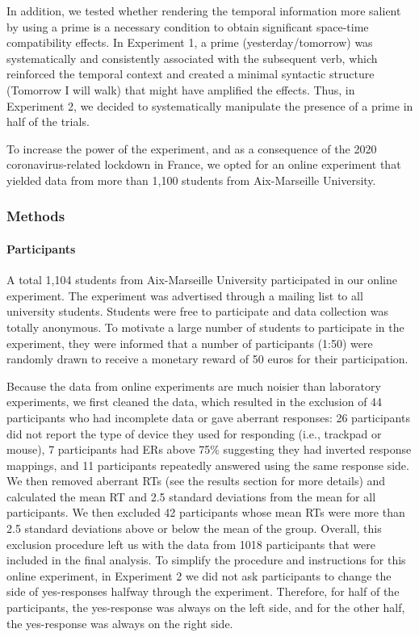 \documentclass[
  a4paper,12pt,twoside,onecolumn,openright,final,oldfontcommands]{memoir}
\begin{document}
In addition, we tested whether rendering the temporal information more salient by using a prime is a necessary condition to obtain significant space-time compatibility effects. In Experiment 1, a prime (yesterday/tomorrow) was systematically and consistently associated with the subsequent verb, which reinforced the temporal context and created a minimal syntactic structure (Tomorrow I will walk) that might have amplified the effects. Thus, in Experiment 2, we decided to systematically manipulate the presence of a prime in half of the trials.

To increase the power of the experiment, and as a consequence of the 2020 coronavirus-related lockdown in France, we opted for an online experiment that yielded data from more than 1,100 students from Aix-Marseille University.

\hypertarget{methods-1}{%
\subsubsection{Methods}\label{methods-1}}

\hypertarget{participants-1}{%
\paragraph{Participants}\label{participants-1}}

A total 1,104 students from Aix-Marseille University participated in our online experiment. The experiment was advertised through a mailing list to all university students. Students were free to participate and data collection was totally anonymous. To motivate a large number of students to participate in the experiment, they were informed that a number of participants (1:50) were randomly drawn to receive a monetary reward of 50 euros for their participation.

Because the data from online experiments are much noisier than laboratory experiments, we first cleaned the data, which resulted in the exclusion of 44 participants who had incomplete data or gave aberrant responses: 26 participants did not report the type of device they used for responding (i.e., trackpad or mouse), 7 participants had ERs above 75\% suggesting they had inverted response mappings, and 11 participants repeatedly answered using the same response side. We then removed aberrant RTs (see the results section for more details) and calculated the mean RT and 2.5 standard deviations from the mean for all participants. We then excluded 42 participants whose mean RTs were more than 2.5 standard deviations above or below the mean of the group. Overall, this exclusion procedure left us with the data from 1018 participants that were included in the final analysis. To simplify the procedure and instructions for this online experiment, in Experiment 2 we did not ask participants to change the side of yes-responses halfway through the experiment. Therefore, for half of the participants, the yes-response was always on the left side, and for the other half, the yes-response was always on the right side.
\end{document}
